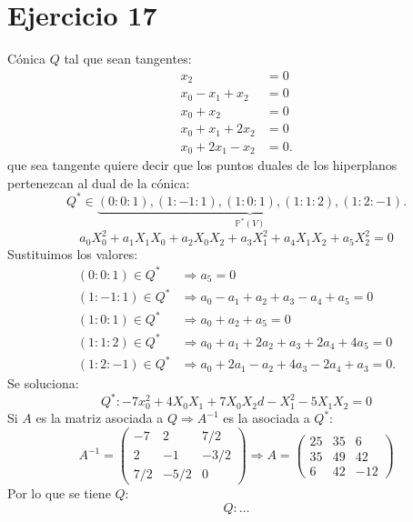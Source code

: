 \documentclass[10pt,a4paper,openright]{book}
\theoremstyle{break}
\begin{document}
\section{Ejercicio 17}%
\label{sec:ejercicio_17_4}
Cónica $Q$ tal que sean tangentes:
\begin{align*}
    x_2 &= 0\\
    x_0 - x_1 + x_2 &= 0\\
    x_0 + x_2 &= 0\\
    x_0 + x_1 + 2x_2 &= 0\\
    x_0 + 2x_1 - x_2 &= 0
.\end{align*}
que sea tangente quiere decir que los puntos duales de los hiperplanos pertenezcan al dual de la cónica:
\[
Q^* \in \underbrace{\left( 0 : 0 : 1 \right), \left( 1 : -1 : 1 \right), \left( 1 : 0 : 1 \right), \left( 1 : 1 : 2 \right), \left( 1 : 2 : -1 \right)}_{\mathbb{P}^{*}\left( V \right)}.
\]\[
a_0X_0^2 + a_1X_1X_0 + a_2X_0X_2 + a_3X_1^2 + a_4X_1X_2 + a_5X_2^2 = 0
\]
Sustituimos los valores:
\begin{align*}
    \left( 0 : 0 : 1 \right) \in Q^* &\Rightarrow a_5 = 0\\
   \left( 1 : -1 : 1 \right) \in Q^* &\Rightarrow a_0 - a_1 + a_2 + a_3 - a_4 + a_5 = 0\\
   \left( 1 : 0 : 1 \right) \in Q^* &\Rightarrow a_0 + a_2 + a_5 = 0\\
   \left( 1 : 1 : 2 \right) \in Q^* &\Rightarrow a_0 + a_1 + 2a_2 + a_3 + 2a_4 + 4a_5 =  0\\
   \left( 1 : 2 : -1 \right) \in Q^* &\Rightarrow a_0 + 2a_1 - a_2 + 4a_3 - 2 a_4 + a_3 = 0
.\end{align*}
Se soluciona:
\[
Q^* : -7x_0^2 + 4X_0X_1 + 7X_0X_2d - X_1^2 - 5X_1X_2 = 0
\]
Si $A$ es la matriz asociada a $Q \Rightarrow A^{-1}$ es la asociada a $Q^*$:
\[
    A^{-1} = \begin{pmatrix} -7 & 2 & 7/2\\ 2 & -1 & -3/2\\ 7/2 & -5/2 & 0 \end{pmatrix} \Rightarrow A = \begin{pmatrix} 25 & 35 & 6\\ 35 & 49 & 42\\ 6 & 42 & -12 \end{pmatrix} 
\]
Por lo que se tiene $Q$:
\[
Q : \ldots
\]
\end{document}
